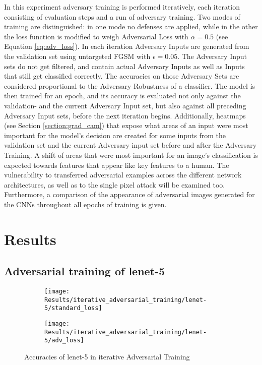 \documentclass[draft,final]{vutinfth} %
\begin{document}
In this experiment adversary training is performed iteratively, each iteration consisting of evaluation steps and a run of adversary training.
Two modes of training are distinguished: in one mode no defenses are applied, while in the other the loss function is modified to weigh Adversarial Loss with $\alpha = 0.5$ (see Equation \ref{eq:adv_loss}).
In each iteration Adversary Inputs are generated from the validation set using untargeted FGSM with $\epsilon = 0.05$.
The Adversary Input sets do not get filtered, and contain actual Adversary Inputs as well as Inputs that still get classified correctly.
The accuracies on those Adversary Sets are considered proportional to the Adversary Robustness of a classifier.
The model is then trained for an epoch, and its accuracy is evaluated not only against the validation- and the current Adversary Input set, but also against all preceding Adversary Input sets, before the next iteration begins.
Additionally, heatmaps (see Section \ref{section:grad_cam}) that expose what areas of an input were most important for the model's decision are created for some inputs from the validation set and the current Adversary input set before and after the Adversary Training.
A shift of areas that were most important for an image's classification is expected towards features that appear like key features to a human.
The vulnerability to transferred adversarial examples across the different network architectures, as well as to the single pixel attack will be examined too.
Furthermore, a comparison of the appearance of adversarial images generated for the CNNs throughout all epochs of training is given.
\newpage

\section{Results}
\label{chp:iat:results}

\subsection{Adversarial training of lenet-5}

\begin{figure}[h]
  \begin{subfigure}[b]{0.5\columnwidth}
		\centering
    \texttt{[image: Results/iterative\_adversarial\_training/lenet-5/standard\_loss]}
    \label{fig:exp:iat:lenet-5:data}
  \end{subfigure}
  \begin{subfigure}[b]{0.5\columnwidth}
		\centering
    \texttt{[image: Results/iterative\_adversarial\_training/lenet-5/adv\_loss]}
    \label{fig:exp:iat:lenet-5:loss}
  \end{subfigure}
  \caption{Accuracies of lenet-5 in iterative Adversarial Training}
	\label{fig:exp:iat:lenet-5}
\end{figure}
\end{document}
